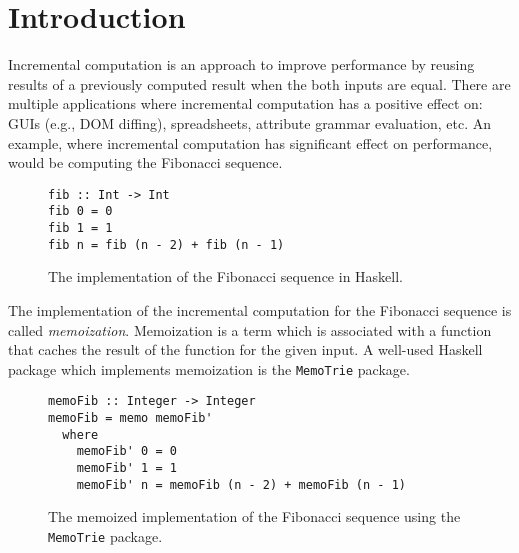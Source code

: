 \chapter{Introduction}



Incremental computation is an approach to improve performance by reusing results of a previously computed result when the both inputs are equal. There are multiple applications where incremental computation has a positive effect on: GUIs (e.g., DOM diffing), spreadsheets, attribute grammar evaluation, etc.  An example, where incremental computation has significant effect on performance, would be computing the Fibonacci sequence.

\begin{figure}[H]
\captionsetup{justification=justified,singlelinecheck=false,margin=0cm}
\begin{verbatim}
fib :: Int -> Int
fib 0 = 0
fib 1 = 1
fib n = fib (n - 2) + fib (n - 1)
\end{verbatim}
\caption{The implementation of the Fibonacci sequence in Haskell.}
\label{fig-fib-alg}
\end{figure}

The implementation of the incremental computation for the Fibonacci sequence is called \textit{memoization}. Memoization is a term which is associated with a function that caches the result of the function for the given input. A well-used Haskell package which implements memoization is the \texttt{MemoTrie} package\cite*{hackage2022memotrie}.

\begin{figure}[H]
\captionsetup{justification=justified,singlelinecheck=false,margin=0cm}
\begin{verbatim}
memoFib :: Integer -> Integer
memoFib = memo memoFib'
  where
    memoFib' 0 = 0
    memoFib' 1 = 1
    memoFib' n = memoFib (n - 2) + memoFib (n - 1)
\end{verbatim}
\caption{The memoized implementation\cite*{memotrie2022fibonacci} of the Fibonacci sequence using the \texttt{MemoTrie} package.}
\label{fig-mem-fib-alg}
\end{figure}


